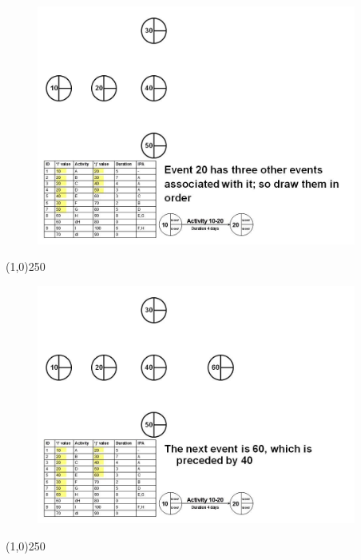 \begin{frame}
\begin{figure}
	\centering
		\includegraphics[width = 10.5cm]{oldnotes/Slide85.jpg}
\end{figure}
\end{frame}
\begin{center}\line(1,0){250}\end{center}


\begin{frame}
\begin{figure}
	\centering
		\includegraphics[width = 10.5cm]{oldnotes/Slide86.jpg}
\end{figure}
\end{frame}
\begin{center}\line(1,0){250}\end{center}


